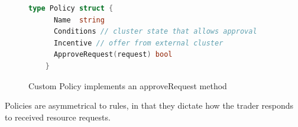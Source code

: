 



\begin{figure}[H]
  \begin{lstlisting}[language=go]
    type Policy struct {
      Name  string
      Conditions // cluster state that allows approval
      Incentive // offer from external cluster
      ApproveRequest(request) bool 
    } 
  \end{lstlisting}
  \caption{Custom Policy implements an approveRequest method}
\end{figure}
Policies are asymmetrical to rules, in that they dictate how the trader
responds to received resource requests.

%
%
%

